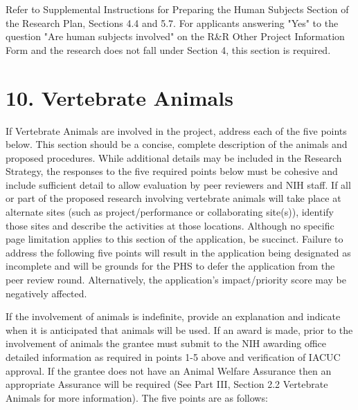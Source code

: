 \documentclass[11pt,notitlepage]{article}
\begin{document}
Refer to Supplemental Instructions for Preparing the Human Subjects Section of the Research Plan, Sections 4.4 and 5.7. For applicants answering "Yes" to the question "Are human subjects involved" on the R\&R Other Project Information Form and the research does not fall under Section 4, this section is required.


\newpage

\section*{10. Vertebrate Animals}

If Vertebrate Animals are involved in the project, address each of the five points below. This section should be a concise, complete description of the animals and proposed procedures. While additional details may be included in the Research Strategy, the responses to the five required points below must be cohesive and include sufficient detail to allow evaluation by peer reviewers and NIH staff. If all or part of the proposed research involving vertebrate animals will take place at alternate sites (such as project/performance or collaborating site(s)), identify those sites and describe the activities at those locations. Although no specific page limitation applies to this section of the application, be succinct. Failure to address the following five points will result in the application being designated as incomplete and will be grounds for the PHS to defer the application from the peer review round. Alternatively, the application’s impact/priority score may be negatively affected.

If the involvement of animals is indefinite, provide an explanation and indicate when it is anticipated that animals will be used. If an award is made, prior to the involvement of animals the grantee must submit to the NIH awarding office detailed information as required in points 1-5 above and verification of IACUC approval. If the grantee does not have an Animal Welfare Assurance then an appropriate Assurance will be required (See Part III, Section 2.2 Vertebrate Animals for more information).
The five points are as follows:
\end{document}
